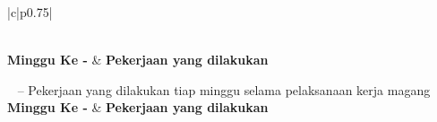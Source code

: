 \begin{center}
\begin{longtable}{|c|p{}|}
\caption{Pekerjaan yang dilakukan tiap minggu selama pelaksanaan kerja magang}
\label{tab:tbl_uraian} \\
\hline
\textbf{Minggu Ke -} & \textbf{Pekerjaan yang dilakukan} \\
\hline
\endfirsthead

%
{{\tablename\ \thetable{} -- Pekerjaan yang dilakukan tiap minggu selama pelaksanaan kerja magang}} \\
\hline
\textbf{Minggu Ke -} & \textbf{Pekerjaan yang dilakukan} \\
\hline
\endhead

\hline {} \\
\hline
\endfoot

\hline \hline
\endlastfoot


\end{longtable}
\end{center}
